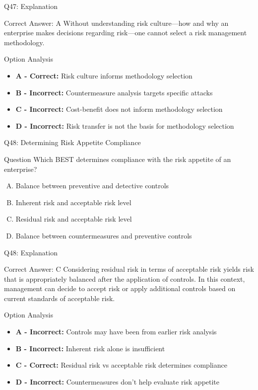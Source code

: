 \documentclass{beamer}
\begin{document}
	\begin{frame}{Q47: Explanation}
		\begin{block}{Correct Answer: A}
			Without understanding risk culture—how and why an enterprise makes decisions regarding risk—one cannot select a risk management methodology.
		\end{block}
		\begin{block}{Option Analysis}
			\begin{itemize}
				\item \textbf{A - Correct:} Risk culture informs methodology selection
				\item \textbf{B - Incorrect:} Countermeasure analysis targets specific attacks
				\item \textbf{C - Incorrect:} Cost-benefit does not inform methodology selection
				\item \textbf{D - Incorrect:} Risk transfer is not the basis for methodology selection
			\end{itemize}
		\end{block}
	\end{frame}
	
	\begin{frame}{Q48: Determining Risk Appetite Compliance}
		\begin{block}{Question}
			Which BEST determines compliance with the risk appetite of an enterprise?
		\end{block}
		\begin{enumerate}[(A)]
			\item Balance between preventive and detective controls
			\item Inherent risk and acceptable risk level
			\item Residual risk and acceptable risk level
			\item Balance between countermeasures and preventive controls
		\end{enumerate}
	\end{frame}
	
	\begin{frame}{Q48: Explanation}
		\begin{block}{Correct Answer: C}
			Considering residual risk in terms of acceptable risk yields risk that is appropriately balanced after the application of controls. In this context, management can decide to accept risk or apply additional controls based on current standards of acceptable risk.
		\end{block}
		\begin{block}{Option Analysis}
			\begin{itemize}
				\item \textbf{A - Incorrect:} Controls may have been from earlier risk analysis
				\item \textbf{B - Incorrect:} Inherent risk alone is insufficient
				\item \textbf{C - Correct:} Residual risk vs acceptable risk determines compliance
				\item \textbf{D - Incorrect:} Countermeasures don't help evaluate risk appetite
			\end{itemize}
		\end{block}
	\end{frame}
	
\end{document}
